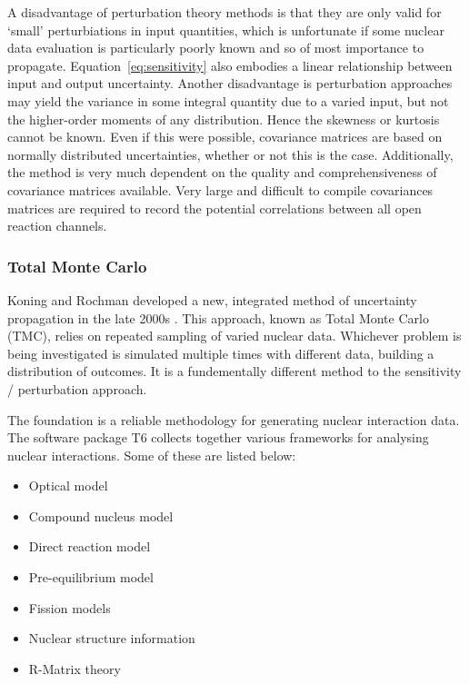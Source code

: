 A disadvantage of perturbation theory methods is that they are only valid for `small' perturbiations in input quantities, which is unfortunate if some nuclear data evaluation is particularly poorly known and so of most importance to propagate. Equation~\ref{eq:sensitivity} also embodies a linear relationship between input and output uncertainty. Another disadvantage is perturbation approaches may yield the variance in some integral quantity due to a varied input, but not the higher-order moments of any distribution. Hence the skewness or kurtosis cannot be known. Even if this were possible, covariance matrices are based on normally distributed uncertainties, whether or not this is the case. Additionally, the method is very much dependent on the quality and comprehensiveness of covariance matrices available. Very large and difficult to compile covariances matrices are required to record the potential correlations between all open reaction channels. 


\FloatBarrier
\subsubsection{Total Monte Carlo}
\label{subsubsec:tmc}
Koning and Rochman developed a new, integrated method of uncertainty propagation in the late 2000s \cite{Koning2008}. This approach, known as Total Monte Carlo (TMC), relies on repeated sampling of varied nuclear data. Whichever problem is being investigated is simulated multiple times with different data, building a distribution of outcomes. It is a fundementally different method to the sensitivity / perturbation approach. 

The foundation is a reliable methodology for generating nuclear interaction data. The software package T6 \cite{Koning2005} collects together various frameworks for analysing nuclear interactions. Some of these are listed below:

\begin{itemize}
  \item Optical model
  \item Compound nucleus model
  \item Direct reaction model
  \item Pre-equilibrium model
  \item Fission models
  \item Nuclear structure information
  \item R-Matrix theory
\end{itemize}

